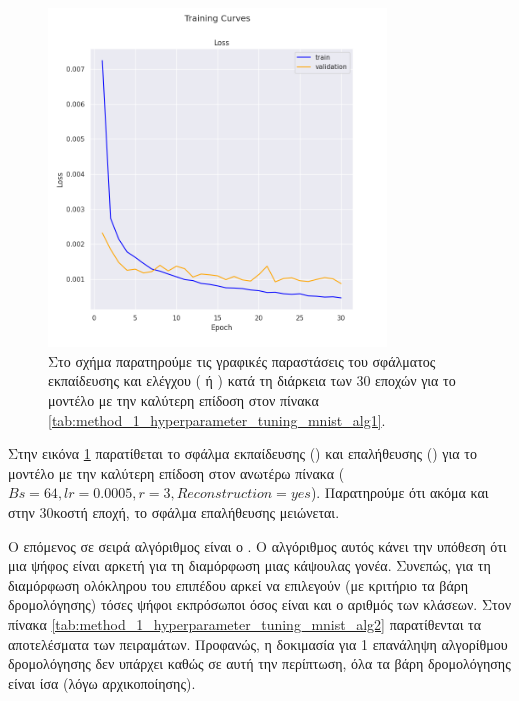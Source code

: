 \begin{figure}[h]
    \centering
    \includegraphics[width=0.8\textwidth]{images/chapter experiments/method 1/image 1/train_curve.png}
    \caption{Στο σχήμα παρατηρούμε τις γραφικές παραστάσεις του σφάλματος εκπαίδευσης και ελέγχου ( ή ) κατά τη διάρκεια των 30 εποχών για το μοντέλο με την καλύτερη επίδοση στον πίνακα \ref{tab:method_1_hyperparameter_tuning_mnist_alg1}.}
    \label{fig:exp_method_1_mnist_alg1}
  \end{figure}
Στην εικόνα \ref{fig:exp_method_1_mnist_alg1} παρατίθεται το σφάλμα εκπαίδευσης () και επαλήθευσης () για το μοντέλο με την καλύτερη επίδοση στον ανωτέρω πίνακα ($Bs = 64, lr = 0.0005, r = 3, Reconstruction = yes$). Παρατηρούμε ότι ακόμα και στην 30κοστή εποχή, το σφάλμα επαλήθευσης μειώνεται.\par

Ο επόμενος σε σειρά αλγόριθμος είναι ο . Ο αλγόριθμος αυτός κάνει την υπόθεση ότι μια ψήφος είναι αρκετή για τη διαμόρφωση μιας κάψουλας γονέα. Συνεπώς, για τη διαμόρφωση ολόκληρου του επιπέδου  αρκεί να επιλεγούν (με κριτήριο τα βάρη δρομολόγησης) τόσες ψήφοι εκπρόσωποι όσος είναι και ο αριθμός των κλάσεων. Στον πίνακα \ref{tab:method_1_hyperparameter_tuning_mnist_alg2} παρατίθενται τα αποτελέσματα των πειραμάτων. Προφανώς, η δοκιμασία για 1 επανάληψη αλγορίθμου δρομολόγησης δεν υπάρχει καθώς σε αυτή την περίπτωση, όλα τα βάρη δρομολόγησης είναι ίσα (λόγω αρχικοποίησης).

